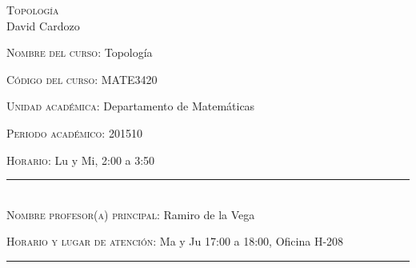 \begin{center}
\textsc{\large  Topología }\\[0.1cm]
\large David Cardozo\\[0.5cm]
\end{center}	

\large \noindent\textsc{Nombre del curso:}  Topología%

\noindent\textsc{Código del curso:} MATE3420 %

\noindent\textsc{Unidad académica:} Departamento de Matemáticas

\noindent\textsc{Periodo acad\'emico:} 201510 %

\noindent\textsc{Horario:} Lu y Mi, 2:00 a 3:50%

\noindent\rule{\textwidth}{1pt}\\[-0.3cm]

\normalsize \noindent\textsc{Nombre profesor(a) principal:} Ramiro de la Vega%


\noindent\textsc{Horario y lugar de atenci\'on:} Ma y Ju 17:00 a
18:00, Oficina H-208

\noindent\rule{\textwidth}{1pt}\\[-0.1cm]